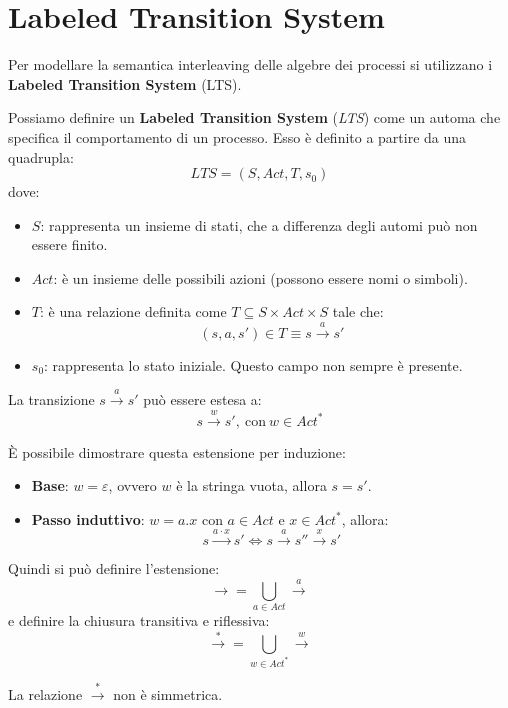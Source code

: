 \section{Labeled Transition System}
Per modellare la semantica interleaving delle algebre dei processi si utilizzano
i \textbf{Labeled Transition System} (LTS).
\begin{definizione}
    Possiamo definire un \textbf{Labeled Transition System} (\textit{LTS}) come
    un automa che specifica il comportamento di un processo. Esso è definito a
    partire da una quadrupla:
    \begin{equation}
        LTS = (S, Act, T, s_0)
    \end{equation}
    dove:
    \begin{itemize}
        \item \textbf{$S$}: rappresenta un insieme di stati, che a differenza
              degli automi può non essere finito.
        \item \textbf{$Act$}: è un insieme delle possibili azioni (possono essere
              nomi o simboli).
        \item \textbf{$T$}: è una relazione definita come
              $T \subseteq S \times Act \times S$ tale che:
              $$(s, a, s') \in T \equiv s \xrightarrow{a} s'$$
        \item \textbf{$s_0$}: rappresenta lo stato iniziale. Questo campo non
              sempre è presente.
    \end{itemize}
\end{definizione}
La transizione $s \xrightarrow{a} s'$ può essere estesa a:
\begin{equation}
    s \xrightarrow{w} s', \ \text{con} \ w \in Act^*
\end{equation}
\begin{dimostrazione}
    È possibile dimostrare questa estensione per induzione:
    \begin{itemize}
        \item \textbf{Base}: $w = \varepsilon$, ovvero $w$ è la stringa vuota,
              allora $s = s'$.
        \item \textbf{Passo induttivo}: $w = a . x$ con $a \in Act$ e
              $x \in Act^*$, allora:
              \begin{equation}
                  s \xrightarrow{a\cdot x} s' \iff s \xrightarrow{a} s''
                  \xrightarrow{x} s'
              \end{equation}
    \end{itemize}
\end{dimostrazione}
Quindi si può definire l'estensione:
\begin{equation}
    \xrightarrow{}  = \bigcup_{a \in Act} \xrightarrow{a}
\end{equation}
e definire la chiusura transitiva e riflessiva:
\begin{equation}
    \xrightarrow{\ast}  = \bigcup_{w \in Act^{\ast}} \xrightarrow{w}
\end{equation}
\begin{nota}
    La relazione $\xrightarrow{\ast}$ non è simmetrica. 
\end{nota}
